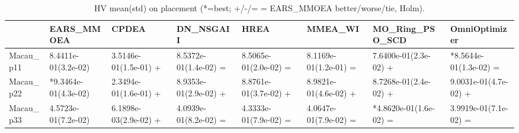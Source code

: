 \begin{table}[t]
\centering
\caption{HV mean(std) on placement (*=best; +/-/= = EARS_MMOEA better/worse/tie, Holm).}
\label{tab:placement_HV}
\begin{tabular}{llllllll}
\toprule
 & EARS\_MMOEA & CPDEA & DN\_NSGAII & HREA & MMEA\_WI & MO\_Ring\_PSO\_SCD & OmniOptimizer \\
\midrule
Macau\_p11 & 8.4411e-01(3.2e-02) & 3.5146e-01(1.5e-01) + & 8.5372e-01(1.4e-02) = & 8.5065e-01(2.0e-02) = & 8.1169e-01(1.2e-01) = & 7.6400e-01(2.3e-02) + & *8.5644e-01(1.3e-02) = \\
Macau\_p22 & *9.3464e-01(4.3e-02) & 2.3494e-01(1.6e-01) + & 8.9353e-01(2.9e-02) + & 8.8761e-01(3.7e-02) + & 8.9821e-01(4.6e-02) + & 8.7268e-01(2.4e-02) + & 9.0031e-01(4.7e-02) + \\
Macau\_p33 & 4.5723e-01(7.2e-02) & 6.1898e-03(2.9e-02) + & 4.0939e-01(8.2e-02) = & 4.3333e-01(7.9e-02) = & 4.0647e-01(7.9e-02) = & *4.8620e-01(1.6e-02) = & 3.9919e-01(7.1e-02) = \\
\bottomrule
\end{tabular}
\end{table}
